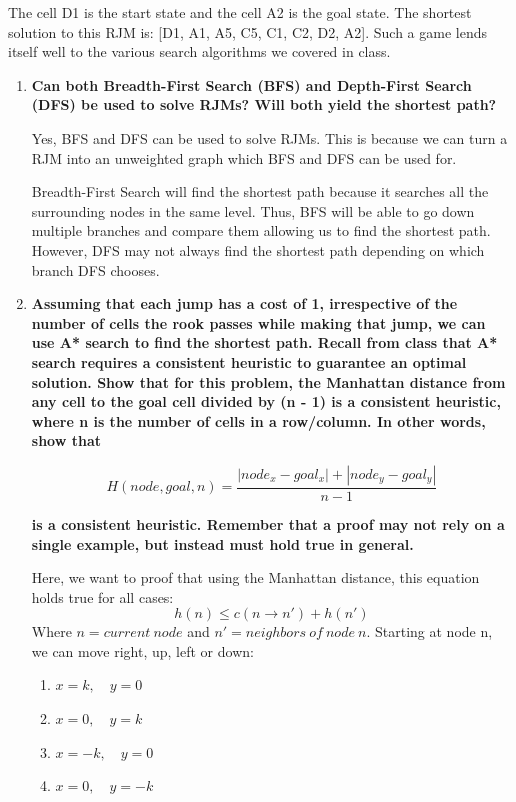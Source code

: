 \documentclass[a4paper]{article}
\begin{document}
\begin{sloppypar}
\noindent The cell D1 is the start state and the cell A2 is the goal state. The shortest solution to this
RJM is: [D1, A1, A5, C5, C1, C2, D2, A2]. Such a game lends itself well to the various
search algorithms we covered in class.

\begin{enumerate}[start=6,label=Q\arabic*,left=0pt]
    \item \textbf{Can both Breadth-First Search (BFS) and Depth-First Search (DFS) be used to solve RJMs? Will both yield the shortest path?}
    
    \par Yes, BFS and DFS can be used to solve RJMs. This is because we can turn a RJM into an unweighted graph which BFS and DFS 
    can be used for. 
    
    Breadth-First Search will find the shortest path because it searches all the surrounding nodes in the same level. Thus, BFS
    will be able to go down multiple branches and compare them allowing us to find the shortest path. However, DFS may not 
    always find the shortest path depending on which branch DFS chooses.

    \item \textbf{Assuming that each jump has a cost of 1, irrespective of the number of cells the rook
    passes while making that jump, we can use A* search to find the shortest path. Recall
    from class that A* search requires a consistent heuristic to guarantee an optimal solution.
    Show that for this problem, the Manhattan distance from any cell to the goal cell divided
    by (n - 1) is a consistent heuristic, where n is the number of cells in a row/column. In other words, show that}

    \[ H(node, goal, n) = \frac{|node_x - goal_x| + |node_y - goal_y|}{n - 1} \]

    \textbf{is a consistent heuristic. Remember that a proof may not rely on a single example, but instead must hold true in general.}
    
    \par Here, we want to proof that using the Manhattan distance, this equation holds true for all cases:
    \[ h(n) \leq c(n \rightarrow n') + h(n') \]
    Where $n = current\:node$ and $n' = neighbors\:of\:node\:n$. Starting at node n, we can move right, up, left or down:
    \begin{enumerate}[start=1,label=\arabic*.,left=0pt]
        \item $ x = k, \quad y = 0 $
        \item $ x = 0, \quad y = k $ 
        \item $ x = -k, \quad y = 0 $
        \item $ x = 0, \quad y = -k $
    \end{enumerate}


\end{enumerate}
\end{sloppypar}
\end{document}
